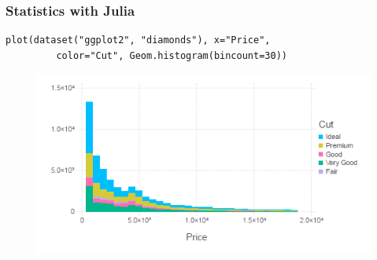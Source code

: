 \documentclass[Master.tex]{subfiles}
\begin{document}
\begin{frame}[fragile]
	\frametitle{Statistics with Julia}
	\large
\begin{verbatim}	
plot(dataset("ggplot2", "diamonds"), x="Price", 
	     color="Cut", Geom.histogram(bincount=30))
\end{verbatim}
\begin{figure}
	\centering
	\includegraphics[width=0.95\linewidth]{images/histogram3}
\end{figure}
\end{frame}
\end{document}
